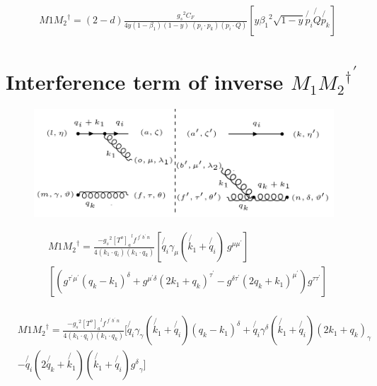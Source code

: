 \begin{equation}
\begin{split}
&M1{M_2}^{\dagger}=(2-d)\frac{{g_s}^2 C_F}{4y(1-\beta_1) (1-y)\:(p_i \cdot p_k)(p_i \cdot Q)}[y{\beta_1}^2 \sqrt{1-y}\not{p_i} \not{Q}\not{p_k}]
\end{split}
\end{equation}

\section{Interference term of inverse ${M_1{M_2}^{\dagger}}^{\prime}$}
\begin{figure}[ht!]
\centering
\includegraphics[scale=0.7]{images/GQ/M1M2DaggerGluon.png}
\end{figure}

\begin{equation}
\begin{split}
&M1{M_2}^{\dagger}=\frac{-{g_s}^2 {[T^{o}]_a}^{l} f^{\:f^{\prime}\: b^{\prime}\:n}}{4(k_1 \cdot q_i)(k_1 \cdot q_k)}[\not{q_i}{\gamma}_{\mu}(\not{k_1}+\not{q_i})\:g^{\mu \mu^{\prime}}]\\
&[ (g^{{{\tau}^{\prime}}{{\mu}^{\prime}}}(q_k-k_1)^{\delta}+g^{{{\mu}^{\prime}}{{\delta}}}(2k_1 +q_k)^{{\tau}^{\prime}}-g^{\delta{{\tau}^{\prime}}}(2q_k+k_1)^{{\mu}^{\prime}})g^{\tau \tau^{\prime}}]\\
\end{split}
\end{equation}

\begin{equation}
\begin{split}
&M1{M_2}^{\dagger}=\frac{-{g_s}^2 {[T^{o}]_a}^{l} f^{\:f^{\prime}\: b^{\prime}\:n}}{4(k_1 \cdot q_i)(k_1 \cdot q_k)}[\not{q_i}{\gamma}_{\gamma}(\not{k_1}+\not{q_i})(q_k-k_1)^{\delta}+\not{q_i}{\gamma}^{\delta}(\not{k_1}+\not{q_i})(2k_1+q_k)_{\gamma}\\
&-\not{q_i}(2\not{q_k}+\not{k_1})(\not{k_1}+\not{q_i}){g^{\delta}}_{\gamma}]\\
\end{split}
\end{equation}

